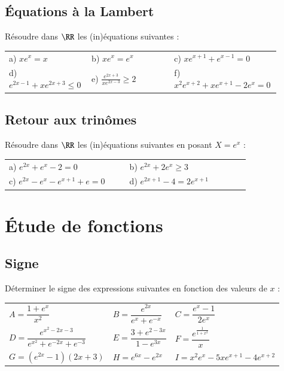 \documentclass[oneside,12pt]{article}          %
\begin{document}
\subsection{Équations à la Lambert}
Résoudre dans $\RR$ les (in)équations suivantes :

\renewcommand{\arraystretch}{1.3}
\begin{tabular}{p{0.3\linewidth}p{0.3\linewidth}p{0.3\linewidth}}
    a) $x e^x = x$ & b)  $x e^x = e^x$ & c)  $x e^{x+1} + e^{x-1} = 0$\\
    d) $e^{2x-1} + x e^{2x+3} \leq 0$ & e) $\frac{e^{2x+3}}{x e^{2x-3}} \geq 2$ & f) $x^2 e^{x+2} + x e^{x+1} - 2e^x = 0$\\
\end{tabular}



\subsection{Retour aux trinômes}
Résoudre dans $\RR$ les (in)équations suivantes en posant $X=e^{x}$ :

\begin{tabular}{p{0.4\linewidth}p{0.4\linewidth}}
    a) $e^{2x}+e^{x}-2 = 0$ & b) $e^{2x}+2e^{x}\ge3$ \\
    c) $e^{2x}-e^{x}-e^{x+1}+e=0$ & d) $e^{2x+1}-4=2e^{x+1}$
\end{tabular}



\section{Étude de fonctions}

\subsection{Signe}
Déterminer le signe des expressions suivantes en fonction des valeurs de $x$ :

\renewcommand{\arraystretch}{2.4}
\begin{tabular}{p{} p{} p{}}
     $A=\dfrac{1+e^{x}}{x^{2}}$ & $B=\dfrac{e^{2x}}{e^{x}+e^{-x}}$ & $C=\dfrac{e^{x}-1}{2e^{x}}$ \\
     $D=\dfrac{e^{x^{2}-2x-3}}{e^{x^{2}}+e^{-2x}+e^{-3}}$ & $E=\dfrac{3+e^{2-3x}}{1-e^{3x}}$ & $F=
     \dfrac{e^{\frac{1}{1+x^{2}}}}{x}$\\
     $G = \left(e^{2x}-1\right)(2x+3)$ & $H = e^{6x}-e^{2x}$ & $I = x^2e^x-5xe^{x+1}-4e^{x+2}$
\end{tabular}
\end{document}
